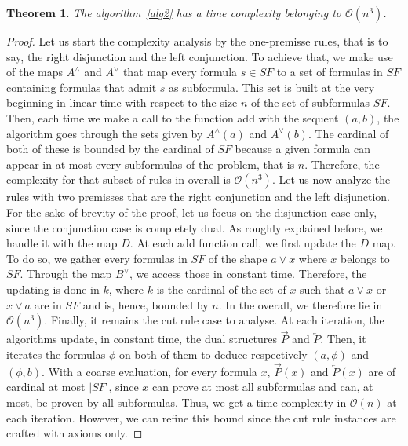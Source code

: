 \documentclass[a4paper, 11pt]{article}
\newtheorem{theorem}{Theorem}
\begin{document}
    \begin{theorem}
	    The algorithm~\ref{alg2} has a time complexity belonging to $\mathcal{O}(n^3)$.
    \end{theorem}
    \begin{proof}
	    Let us start the complexity analysis by the one-premisse rules, that is to say, the right 
	    disjunction and the left conjunction. To achieve that, we make use of the maps $A^\wedge$
	    and $A^\vee$ that map every formula $s\in SF$ to a set of formulas in $SF$ containing 
	    formulas
	    that admit $s$ as subformula. This set is built at the very beginning in linear time with
	    respect to the size $n$ of the set of subformulas $SF$. Then, each time we make a call to the
	    function \textsf{add} with the sequent $(a,b)$, the algorithm goes through the sets given by 
	    $A^\wedge(a)$ and $A^\vee(b)$. The cardinal of both of these is bounded by the cardinal of 
	    $SF$ because a given formula can appear in at most every subformulas of the problem, that
	    is $n$. Therefore, the complexity for that subset of rules in overall is $\mathcal{O}(n^3)$. 
	    Let us now
	    analyze the rules with two premisses that are the right conjunction and the left disjunction.
	    For the sake of brevity of the proof, let us focus on the disjunction case only, since the 
	    conjunction case is completely dual. As roughly explained before, we handle it with the
	    map $D$. At each \textsf{add} function call, we first update the $D$ map. To do so,
	    we gather every formulas in $SF$ of the shape $a\vee x$ where $x$ belongs to $SF$. Through 
	    the map $B^\vee$, we access those in constant time. Therefore, the updating is done in $k$, 
	    where $k$ is the cardinal of the set of $x$ such that $a\vee x$ or $x\vee a$ are in $SF$ 
	    and is,
	    hence, bounded by $n$. In the overall, we therefore lie in $\mathcal{O}(n^3)$. Finally,
	    it remains the cut rule case to analyse. At each iteration, the algorithms update, in
	    constant time, the dual structures $\overrightarrow{P}$ and $\overleftarrow{P}$. Then, it
	    iterates the formulas $\phi$ on both of them to deduce respectively $(a,\phi)$ and 
	    $(\phi,b)$. With a coarse evaluation, for every formula $x$, $\overrightarrow{P}(x)$ and
	    $\overleftarrow{P}(x)$ are of cardinal at most $|SF|$, since $x$ can prove at most
	    all subformulas and can, at most, be proven by all subformulas. Thus, we get a time
	    complexity in $\mathcal{O}(n)$ at each iteration. However, we can refine this bound since
	    the cut rule instances are crafted with axioms only.

\end{proof}
\end{document}
